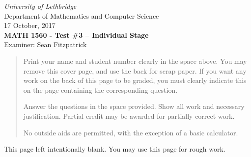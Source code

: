 \documentclass[12pt]{article}
\newcommand{\skipline}{\vspace{12pt}}
\begin{document}
\author{Instructor: Sean Fitzpatrick}
\thispagestyle{plain}
\begin{center}
\emph{University of Lethbridge}\\
Department of Mathematics and Computer Science\\
17 October, 2017\\
{\bf MATH 1560 - Test \#3 -- Individual Stage}\\
Examiner: Sean Fitzpatrick
\end{center}



\vspace{0.1in}

\vspace*{\fill}

\begin{quote}
Print your name and student number clearly in the space above. You may remove this cover page, and use the back for scrap paper. If you want any work on the back of this page to be graded, you must clearly indicate this on the page containing the corresponding question.

\medskip

Answer the questions in the space provided. Show all work and necessary justification. Partial credit may be awarded for partially correct work.
 
\medskip

No outside aids are permitted, with the exception of a basic calculator. 
\end{quote}



\newpage

This page left intentionally blank. You may use this page for rough work.
\newpage
\end{document}
